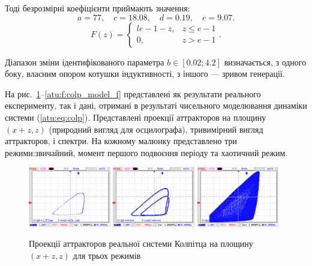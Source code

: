 Тоді безрозмірні коефіцієнти приймають значення:
\[
 a = 77,     \quad
 c = 18.08,  \quad
 d = 0.19,   \quad
 e = 9.07.
\]
%
\[
F(z) =
\begin{cases}{l}
  e-1-z, & z \le e-1  \\
  0,     & z  >  e-1
\end{cases}.
\]

Діапазон зміни ідентифікованого параметра
$b \in [0.02; 4.2] $ визначається, з одного боку, власним опором котушки
індуктивності, з іншого --- зривом генерації.

На рис.~\ref{atu:f:colp_real_xzz}--\ref{atu:f:colp_model_f} представлені як
результати реального експерименту, так і дані, отримані в
результаті чисельного моделювання динаміки системи (\ref{atu:eq:colp}).
Представлені проекції аттракторов на площину
$(x + z, z) $ (природний вигляд для осцилографа), тривимірний вигляд
аттракторов, і спектри. На кожному малюнку представлено три
режими:звичайний, момент першого подвоєння періоду та хаотичний
режим.


\begin{figure}[htb!]
 \centerline{
   \includegraphics[width=0.32\textwidth]{p/mod/colp_m1_vv.png}
   \includegraphics[width=0.32\textwidth]{p/mod/colp_m2_vv.png}
   \includegraphics[width=0.32\textwidth]{p/mod/colp_m3_vv_ac.png}
 }
\caption{Проекції аттракторов реальної системи Колпітца на площину $ (x + z, z) $ для трьох режимів}
\label{atu:f:colp_real_xzz}
\end{figure}

